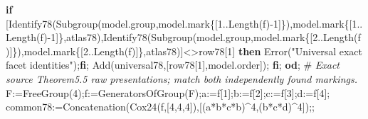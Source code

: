 \documentclass[
  10pt,
  letterpaper,
]{article}
\newenvironment{Shaded}{}{}
\newcommand{\BuiltInTok}[1]{\textcolor[rgb]{0.00,0.50,0.00}{#1}}
\newcommand{\CommentTok}[1]{\textcolor[rgb]{0.38,0.63,0.69}{\textit{#1}}}
\newcommand{\ControlFlowTok}[1]{\textcolor[rgb]{0.00,0.44,0.13}{\textbf{#1}}}
\newcommand{\FloatTok}[1]{\textcolor[rgb]{0.25,0.63,0.44}{#1}}
\newcommand{\NormalTok}[1]{#1}
\newcommand{\OperatorTok}[1]{\textcolor[rgb]{0.40,0.40,0.40}{#1}}
\newcommand{\StringTok}[1]{\textcolor[rgb]{0.25,0.44,0.63}{#1}}
\newcommand{\VariableTok}[1]{\textcolor[rgb]{0.10,0.09,0.49}{#1}}
\begin{document}
\begin{Shaded}
\begin{Highlighting}[]
  \ControlFlowTok{if}\NormalTok{ [}\VariableTok{Identify78}\NormalTok{(}\BuiltInTok{Subgroup}\NormalTok{(}\VariableTok{model}\NormalTok{.}\VariableTok{group}\OperatorTok{,}\VariableTok{model}\NormalTok{.}\VariableTok{mark}\NormalTok{\{[}\FloatTok{1}\OperatorTok{..}\BuiltInTok{Length}\NormalTok{(}\VariableTok{f}\NormalTok{)}\OperatorTok{{-}}\FloatTok{1}\NormalTok{]\})}\OperatorTok{,}\VariableTok{model}\NormalTok{.}\VariableTok{mark}\NormalTok{\{[}\FloatTok{1}\OperatorTok{..}\BuiltInTok{Length}\NormalTok{(}\VariableTok{f}\NormalTok{)}\OperatorTok{{-}}\FloatTok{1}\NormalTok{]\}}\OperatorTok{,}\VariableTok{atlas78}\NormalTok{)}\OperatorTok{,}\VariableTok{Identify78}\NormalTok{(}\BuiltInTok{Subgroup}\NormalTok{(}\VariableTok{model}\NormalTok{.}\VariableTok{group}\OperatorTok{,}\VariableTok{model}\NormalTok{.}\VariableTok{mark}\NormalTok{\{[}\FloatTok{2}\OperatorTok{..}\BuiltInTok{Length}\NormalTok{(}\VariableTok{f}\NormalTok{)]\})}\OperatorTok{,}\VariableTok{model}\NormalTok{.}\VariableTok{mark}\NormalTok{\{[}\FloatTok{2}\OperatorTok{..}\BuiltInTok{Length}\NormalTok{(}\VariableTok{f}\NormalTok{)]\}}\OperatorTok{,}\VariableTok{atlas78}\NormalTok{)]}\OperatorTok{\textless{}\textgreater{}}\VariableTok{row78}\NormalTok{[}\FloatTok{1}\NormalTok{] }\ControlFlowTok{then} \BuiltInTok{Error}\NormalTok{(}\StringTok{"Universal exact facet identities"}\NormalTok{)}\OperatorTok{;}\ControlFlowTok{fi}\OperatorTok{;}
  \BuiltInTok{Add}\NormalTok{(}\VariableTok{universal78}\OperatorTok{,}\NormalTok{[}\VariableTok{row78}\NormalTok{[}\FloatTok{1}\NormalTok{]}\OperatorTok{,}\VariableTok{model}\NormalTok{.}\VariableTok{order}\NormalTok{])}\OperatorTok{;}
 \ControlFlowTok{fi}\OperatorTok{;}
\ControlFlowTok{od}\OperatorTok{;}
\NormalTok{\#}\CommentTok{ Exact source Theorem5.5 raw presentations; match both independently found markings.}
\VariableTok{F}\OperatorTok{:=}\BuiltInTok{FreeGroup}\NormalTok{(}\FloatTok{4}\NormalTok{)}\OperatorTok{;}\VariableTok{f}\OperatorTok{:=}\BuiltInTok{GeneratorsOfGroup}\NormalTok{(}\VariableTok{F}\NormalTok{)}\OperatorTok{;}\VariableTok{a}\OperatorTok{:=}\VariableTok{f}\NormalTok{[}\FloatTok{1}\NormalTok{]}\OperatorTok{;}\VariableTok{b}\OperatorTok{:=}\VariableTok{f}\NormalTok{[}\FloatTok{2}\NormalTok{]}\OperatorTok{;}\VariableTok{c}\OperatorTok{:=}\VariableTok{f}\NormalTok{[}\FloatTok{3}\NormalTok{]}\OperatorTok{;}\VariableTok{d}\OperatorTok{:=}\VariableTok{f}\NormalTok{[}\FloatTok{4}\NormalTok{]}\OperatorTok{;}
\VariableTok{common78}\OperatorTok{:=}\BuiltInTok{Concatenation}\NormalTok{(}\VariableTok{Cox24}\NormalTok{(}\VariableTok{f}\OperatorTok{,}\NormalTok{[}\FloatTok{4}\OperatorTok{,}\FloatTok{4}\OperatorTok{,}\FloatTok{4}\NormalTok{])}\OperatorTok{,}\NormalTok{[(}\VariableTok{a}\OperatorTok{*}\VariableTok{b}\OperatorTok{*}\VariableTok{c}\OperatorTok{*}\VariableTok{b}\NormalTok{)}\OperatorTok{\^{}}\FloatTok{4}\OperatorTok{,}\NormalTok{(}\VariableTok{b}\OperatorTok{*}\VariableTok{c}\OperatorTok{*}\VariableTok{d}\NormalTok{)}\OperatorTok{\^{}}\FloatTok{4}\NormalTok{])}\OperatorTok{;;}

\end{Highlighting}
\end{Shaded}
\end{document}
